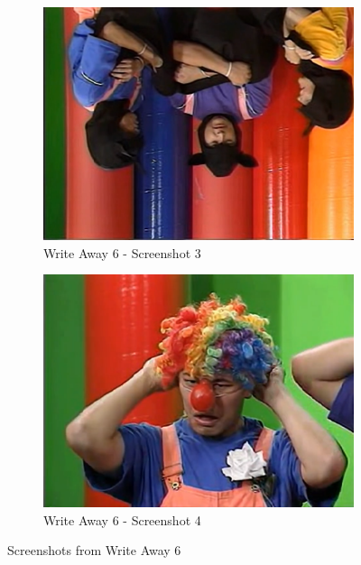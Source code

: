 \begin{figure}[H]
    \begin{subfigure}{0.45\textwidth}
        \centering
        \includegraphics[width=\linewidth]{Games/WriteAway/Images/WriteAway6Screenshot3.png}
        \caption{Write Away 6 - Screenshot 3}
    \end{subfigure}
    \begin{subfigure}{0.45\textwidth}
        \centering
        \includegraphics[width=\linewidth]{Games/WriteAway/Images/WriteAway6Screenshot4.png}
        \caption{Write Away 6 - Screenshot 4}
    \end{subfigure}
    \caption{Screenshots from Write Away 6}
\end{figure}
